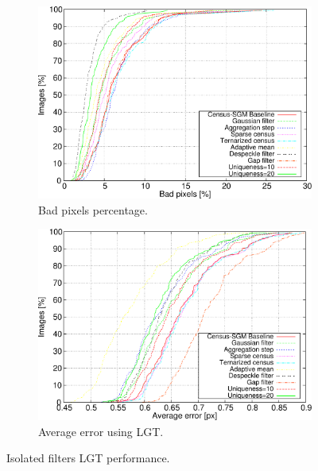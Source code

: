 \begin{figure}[p]
      \centering
      \begin{subfigure}[h]{\textwidth}
	\centering
	\includegraphics[width=\textwidth, height=0.4\textheight, trim=0 0 0 0,clip]{filt_bpp}
	
	\caption{ Bad pixels percentage.}
	\label{fig:cp03_isolated_LGT_bpp} 
      \end{subfigure}%
      
      \begin{subfigure}[h]{\textwidth}
	\centering
	\includegraphics[width=\textwidth, height=0.4\textheight, trim=0 0 0 0,clip]{filt_avg}
	\caption{ Average error using LGT. }
	\label{fig:cp03_isolated_LGT_avg}
      \end{subfigure}%
      \caption{ Isolated filters LGT performance. }
\end{figure}


